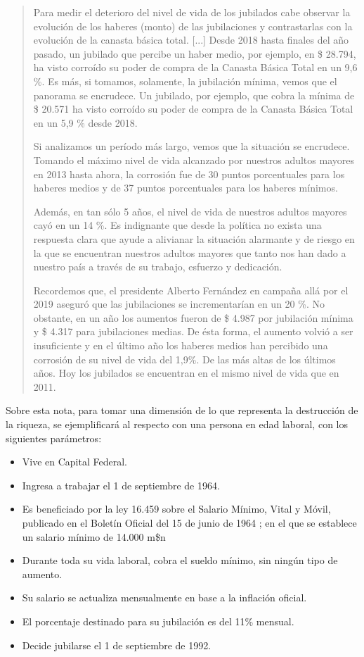 \documentclass[12pt,a4paper,twoside]{book}
\begin{document}
\begin{quotation}
Para medir el deterioro del nivel de vida de los jubilados cabe observar la evolución de los haberes (monto) de las jubilaciones y contrastarlas con la evolución de la canasta básica total. [...] Desde 2018 hasta finales del año pasado, un jubilado que percibe un haber medio, por ejemplo, en \$ 28.794, ha visto corroído su poder de compra de la Canasta Básica Total en un 9,6 \%. Es más, si tomamos, solamente, la jubilación mínima, vemos que el panorama se encrudece. Un jubilado, por ejemplo, que cobra la mínima de \$ 20.571 ha visto corroído su poder de compra de la Canasta Básica Total en un 5,9 \% desde 2018.

Si analizamos un período más largo, vemos que la situación se encrudece. Tomando el máximo nivel de vida alcanzado por nuestros adultos mayores en 2013 hasta ahora, la corrosión fue de 30 puntos porcentuales para los haberes medios y de 37 puntos porcentuales para los haberes mínimos.  

Además, en tan sólo 5 años, el nivel de vida de nuestros adultos mayores cayó en un 14 \%. Es indignante que desde la política no exista una respuesta clara que ayude a alivianar la situación alarmante y de riesgo en la que se encuentran nuestros adultos mayores que tanto nos han dado a nuestro país a través de su trabajo, esfuerzo y dedicación.

Recordemos que, el presidente Alberto Fernández en campaña allá por el 2019 aseguró que las jubilaciones se incrementarían en un 20 \%. No obstante, en un año los aumentos fueron de \$ 4.987 por jubilación mínima y \$ 4.317 para jubilaciones medias. De ésta forma, el aumento volvió a ser insuficiente y en el último año los haberes medios han percibido una corrosión de su nivel de vida del 1,9\%.  De las más altas de los últimos años. Hoy los jubilados se encuentran en el mismo nivel de vida que en 2011. \cite{motyl:jubilacion} 
\end{quotation}

Sobre esta nota, para tomar una dimensión de lo que representa la destrucción de la riqueza, se ejemplificará al respecto con una persona en edad laboral, con los siguientes parámetros:

\begin{itemize}
\item Vive en Capital Federal.
\item Ingresa a trabajar el 1 de septiembre de 1964.
\item Es beneficiado por la ley 16.459 sobre el Salario Mínimo, Vital y Móvil, publicado en el Boletín Oficial del 15 de junio de 1964 \cite{ley:16459}; en el que se establece un salario mínimo de 14.000 m\$n \cite{ley:16459-reglamentacion}
\item Durante toda su vida laboral, cobra el sueldo mínimo, sin ningún tipo de aumento.
\item Su salario se actualiza mensualmente en base a la inflación oficial.
\item El porcentaje destinado para su jubilación es del 11\% mensual.
\item Decide jubilarse el 1 de septiembre de 1992.
\end{itemize}
\end{document}
